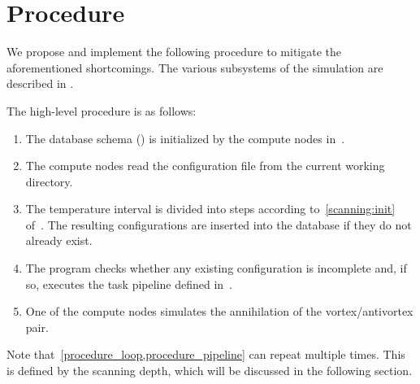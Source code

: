 \section{Procedure}
	We propose and implement the following procedure to mitigate the aforementioned shortcomings. The various subsystems of the simulation are described in .
	
	The high-level procedure is as follows:
	\begin{enumerate}
		\item The database schema () is initialized by the compute nodes in~.
		\item The compute nodes read the configuration file from the current working directory.
		\item \label{procedure_loop} The temperature interval is divided into steps according to~\cref{scanning:init} of~. The resulting configurations are inserted into the database if they do not already exist.
		\item \label{procedure_pipeline} The program checks whether any existing configuration is incomplete and, if so, executes the task pipeline defined in~.
		\item One of the compute nodes simulates the annihilation of the vortex/antivortex pair.
	\end{enumerate}
	Note that~\cref{procedure_loop,procedure_pipeline} can repeat multiple times. This is defined by the scanning depth, which will be discussed in the following section.

